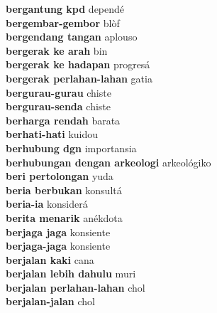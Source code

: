 \textbf{ bergantung kpd  } dependé \\
\textbf{ bergembar-gembor  } blòf \\
\textbf{ bergendang tangan  } aplouso \\
\textbf{ bergerak ke arah  } bin \\
\textbf{ bergerak ke hadapan  } progresá \\
\textbf{ bergerak perlahan-lahan  } gatia \\
\textbf{ bergurau-gurau  } chiste \\
\textbf{ bergurau-senda  } chiste \\
\textbf{ berharga rendah  } barata \\
\textbf{ berhati-hati  } kuidou \\
\textbf{ berhubung dgn  } importansia \\
\textbf{ berhubungan dengan arkeologi  } arkeológiko \\
\textbf{ beri pertolongan  } yuda \\
\textbf{ beria berbukan  } konsultá \\
\textbf{ beria-ia  } konsiderá \\
\textbf{ berita menarik  } anékdota \\
\textbf{ berjaga jaga  } konsiente \\
\textbf{ berjaga-jaga  } konsiente \\
\textbf{ berjalan kaki  } cana \\
\textbf{ berjalan lebih dahulu  } muri \\
\textbf{ berjalan perlahan-lahan  } chol \\
\textbf{ berjalan-jalan  } chol \\
